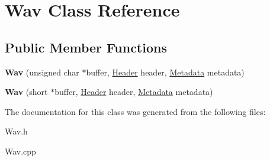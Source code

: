 \hypertarget{classWav}{}\section{Wav Class Reference}
\label{classWav}
\subsection*{Public Member Functions}
\begin{DoxyCompactItemize}
\item 
\mbox{\label{classWav_a82130eb49817ae2cdd24ef9106bec497}} 
{\bfseries Wav} (unsigned char $\ast$buffer, \hyperlink{structHeader}{Header} header, \hyperlink{structMetadata}{Metadata} metadata)
\item 
\mbox{\label{classWav_a0b30ad397e92701ed0f96e0e5d90cec2}} 
{\bfseries Wav} (short $\ast$buffer, \hyperlink{structHeader}{Header} header, \hyperlink{structMetadata}{Metadata} metadata)
\end{DoxyCompactItemize}


The documentation for this class was generated from the following files\+:\begin{DoxyCompactItemize}
\item 
Wav.\+h\item 
Wav.\+cpp\end{DoxyCompactItemize}
